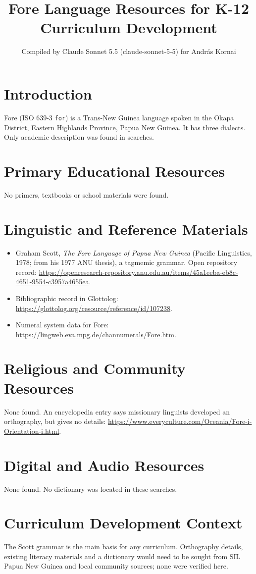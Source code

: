 \documentclass[12pt]{article}
\title{Fore Language Resources for K-12 Curriculum Development}
\author{Compiled by Claude Sonnet 5.5 (claude-sonnet-5-5) for Andr\'as Kornai}
\date{}
\begin{document}
\maketitle

\section{Introduction}
Fore (ISO 639-3 \texttt{for}) is a Trans-New Guinea language spoken in the Okapa District, Eastern Highlands Province, Papua New Guinea. It has three dialects. Only academic description was found in searches.

\section{Primary Educational Resources}
No primers, textbooks or school materials were found.

\section{Linguistic and Reference Materials}
\begin{itemize}
\item Graham Scott, \emph{The Fore Language of Papua New Guinea} (Pacific Linguistics, 1978; from his 1977 ANU thesis), a tagmemic grammar. Open repository record: \url{https://openresearch-repository.anu.edu.au/items/45a1eeba-eb8c-4651-9554-c3957a4655ea}.
\item Bibliographic record in Glottolog: \url{https://glottolog.org/resource/reference/id/107238}.
\item Numeral system data for Fore: \url{https://lingweb.eva.mpg.de/channumerals/Fore.htm}.
\end{itemize}

\section{Religious and Community Resources}
None found. An encyclopedia entry says missionary linguists developed an orthography, but gives no details: \url{https://www.everyculture.com/Oceania/Fore-i-Orientation-i.html}.

\section{Digital and Audio Resources}
None found. No dictionary was located in these searches.

\section{Curriculum Development Context}
The Scott grammar is the main basis for any curriculum. Orthography details, existing literacy materials and a dictionary would need to be sought from SIL Papua New Guinea and local community sources; none were verified here.
\end{document}
